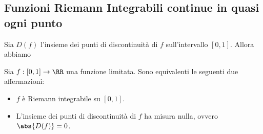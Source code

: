 \documentclass[11pt]{scrartcl}
\begin{document}
	 \subsection{Funzioni Riemann Integrabili continue in quasi ogni punto}
	 Sia $D(f)$ l'insieme dei punti di discontinuità di $f$ sull'intervallo $[0,1]$. Allora abbiamo
	 \begin{theorem}
	 	Sia $f:[0,1]\to\RR$ una funzione limitata. Sono equivalenti le seguenti due affermazioni:
	 	\begin{itemize}
	 		\item $f$ è Riemann integrabile su $[0,1]$.
	 		\item L'insieme dei punti di discontinuità di $f$ ha misura nulla, ovvero $\abs{D(f)}=0$.
	 	\end{itemize}
	 \end{theorem}
\end{document}

